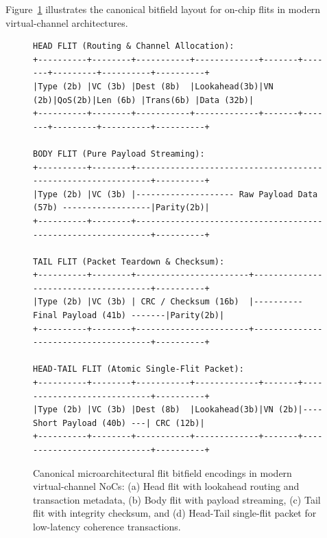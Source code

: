 Figure~\ref{fig:ch2_flit_formats} illustrates the canonical bitfield layout for on-chip flits in modern virtual-channel architectures.

\begin{figure}[t]
\centering
\begin{minipage}{0.98\textwidth}
\begin{verbatim}
HEAD FLIT (Routing & Channel Allocation):
+----------+--------+-----------+-------------+-------+-------+---------+----------+----------+
|Type (2b) |VC (3b) |Dest (8b)  |Lookahead(3b)|VN (2b)|QoS(2b)|Len (6b) |Trans(6b) |Data (32b)|
+----------+--------+-----------+-------------+-------+-------+---------+----------+----------+

BODY FLIT (Pure Payload Streaming):
+----------+--------+--------------------------------------------------------------+----------+
|Type (2b) |VC (3b) |-------------------- Raw Payload Data (57b) ------------------|Parity(2b)|
+----------+--------+--------------------------------------------------------------+----------+

TAIL FLIT (Packet Teardown & Checksum):
+----------+--------+-----------------------+--------------------------------------+----------+
|Type (2b) |VC (3b) | CRC / Checksum (16b)  |---------- Final Payload (41b) -------|Parity(2b)|
+----------+--------+-----------------------+--------------------------------------+----------+

HEAD-TAIL FLIT (Atomic Single-Flit Packet):
+----------+--------+-----------+-------------+-------+----------------------------+----------+
|Type (2b) |VC (3b) |Dest (8b)  |Lookahead(3b)|VN (2b)|---- Short Payload (40b) ---| CRC (12b)|
+----------+--------+-----------+-------------+-------+----------------------------+----------+
\end{verbatim}
\end{minipage}
\caption{Canonical microarchitectural flit bitfield encodings in modern virtual-channel NoCs: (a) Head flit with lookahead routing and transaction metadata, (b) Body flit with payload streaming, (c) Tail flit with integrity checksum, and (d) Head-Tail single-flit packet for low-latency coherence transactions.}
\label{fig:ch2_flit_formats}
\end{figure}


